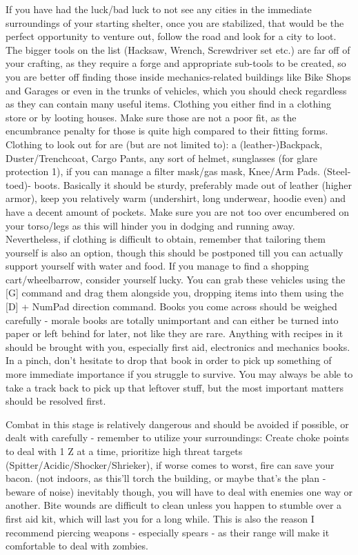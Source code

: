 \documentclass[11pt]{report}
\begin{document}
If you have had the luck/bad luck to not see any cities in the immediate surroundings of your starting shelter, once you are stabilized, that would be the perfect opportunity to venture out, follow the road and look for a city to loot.
The bigger tools on the list (Hacksaw, Wrench, Screwdriver set etc.) are far off of your crafting, as they require a forge and appropriate sub-tools to be created, so you are better off finding those inside mechanics-related buildings like Bike Shops and Garages or even in the trunks of vehicles, which you should check regardless as they can contain many useful items.
Clothing you either find in a clothing store or by looting houses. Make sure those are not a poor fit, as the encumbrance penalty for those is quite high compared to their fitting forms. Clothing to look out for are (but are not limited to): a (leather-)Backpack, Duster/Trenchcoat, Cargo Pants, any sort of helmet, sunglasses (for glare protection 1), if you can manage a filter mask/gas mask, Knee/Arm Pads. (Steel-toed)- boots. Basically it should be sturdy, preferably made out of leather (higher armor), keep you relatively warm (undershirt, long underwear, hoodie even) and have a decent amount of pockets. Make sure you are not too over encumbered on your torso/legs as this will hinder you in dodging and running away. Nevertheless, if clothing is difficult to obtain, remember that tailoring them yourself is also an option, though this should be postponed till you can actually support yourself with water and food.
If you manage to find a shopping cart/wheelbarrow, consider yourself lucky. You can grab these vehicles using the [G] command and drag them alongside you, dropping items into them using the [D] + NumPad direction command.
Books you come across should be weighed carefully - morale books are totally unimportant and can either be turned into paper or left behind for later, not like they are rare. Anything with recipes in it should be brought with you, especially first aid, electronics and mechanics books. In a pinch, don't hesitate to drop that book in order to pick up something of more immediate importance if you struggle to survive. You may always be able to take a track back to pick up that leftover stuff, but the most important matters should be resolved first.

Combat in this stage is relatively dangerous and should be avoided if possible, or dealt with carefully - remember to utilize your surroundings: Create choke points to deal with 1 Z at a time, prioritize high threat targets (Spitter/Acidic/Shocker/Shrieker), if worse comes to worst, fire can save your bacon. (not indoors, as this'll torch the building, or maybe that's the plan - beware of noise) inevitably though, you will have to deal with enemies one way or another. Bite wounds are difficult to clean unless you happen to stumble over a first aid kit, which will last you for a long while. This is also the reason I recommend piercing weapons - especially spears - as their range will make it comfortable to deal with zombies.
\end{document}
